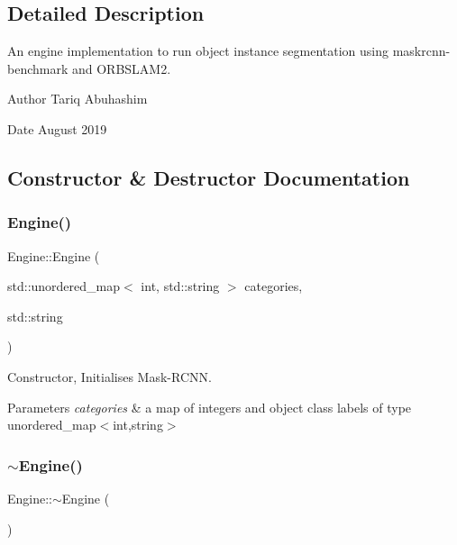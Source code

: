\subsection{Detailed Description}
An engine implementation to run object instance segmentation using maskrcnn-\/benchmark and O\+R\+B\+S\+L\+A\+M2. 

\begin{DoxyAuthor}{Author}
Tariq Abuhashim 
\end{DoxyAuthor}
\begin{DoxyDate}{Date}
August 2019 
\end{DoxyDate}


\subsection{Constructor \& Destructor Documentation}
\mbox{\label{classEngine_ab3818182cd3d2b3a788ac04d743cf6f4}} 
\subsubsection{\texorpdfstring{Engine()}{Engine()}}
{\footnotesize\ttfamily Engine\+::\+Engine (\begin{DoxyParamCaption}\item[{std\+::unordered\+\_\+map$<$ int, std\+::string $>$}]{categories,  }\item[{std\+::string}]{ }\end{DoxyParamCaption})}

Constructor, Initialises Mask-\/\+R\+C\+NN. 
\begin{DoxyParams}{Parameters}
{\em categories} & a map of integers and object class labels of type unordered\+\_\+map$<$int,string$>$ \\
\hline
\end{DoxyParams}
\mbox{\label{classEngine_a8ef7030a089ecb30bbfcb9e43094717a}} 
\subsubsection{\texorpdfstring{$\sim$\+Engine()}{~Engine()}}
{\footnotesize\ttfamily Engine\+::$\sim$\+Engine (\begin{DoxyParamCaption}{ }\end{DoxyParamCaption})}

